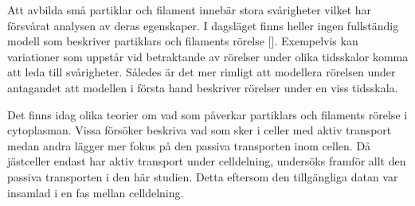 Att avbilda små partiklar och filament innebär stora svårigheter vilket har försvårat analysen av deras egenskaper. I dagsläget finns heller ingen fullständig modell som beskriver partiklars och filaments rörelse []. %
Exempelvis kan variationer som uppstår vid betraktande av rörelser under olika tidsskalor komma att leda till svårigheter. %
Således är det mer rimligt att modellera rörelsen under antagandet att modellen i första hand beskriver rörelser under en viss tidsskala.%

Det finns idag olika teorier om vad som påverkar partiklars och filaments rörelse i cytoplasman. Vissa försöker beskriva vad som sker i celler med aktiv transport medan andra lägger mer fokus på den passiva transporten inom cellen. Då jästceller endast har aktiv transport under celldelning, undersöks framför allt den passiva transporten i den här studien. Detta eftersom den tillgängliga datan var insamlad i en fas mellan celldelning. 












